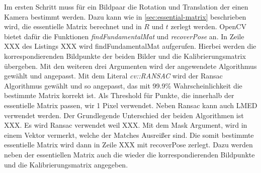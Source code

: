 Im ersten Schritt muss für ein Bildpaar die Rotation und Translation der einen Kamera bestimmt werden.
Dazu kann wie in \cref{sec:essential-matrix} beschrieben wird, die essentielle Matrix berechnet und in $R$ und $t$ zerlegt werden.
OpenCV bietet dafür die Funktionen \emph{findFundamentalMat} und \emph{recoverPose} an.
In Zeile XXX des Listings XXX wird findFundamentalMat aufgerufen. 
Hierbei werden die korrespondierenden Bildpunkte der beiden Bilder und die Kalibrierungsmatrix übergeben.
Mit den weiteren drei Argumenten wird der angewendete Algorithmus gewählt und angepasst.
Mit dem Literal \emph{cv::RANSAC} wird der Ransac Algorithmus gewählt und so angepasst, das mit 99.9\% Wahrscheinlichkeit die bestimmte Matrix korrekt ist.
Als Threshold für Punkte, die innerhalb der essentielle Matrix passen, wir 1 Pixel verwendet. 
Neben Ransac kann auch LMED verwendet werden.
Der Grundlegende Unterschied der beiden Algorithmen ist XXX.
Es wird Ransac verwendet weil XXX.
Mit dem Mask Argument, wird in einem Vektor vermerkt, welche der Matches Ausreißer sind.
Die somit bestimmte essentielle Matrix wird dann in Zeile XXX mit recoverPose zerlegt.
Dazu werden neben der essentiellen Matrix auch die wieder die korrespondierenden Bildpunkte und die Kalibrierungsmatrix angegeben.

